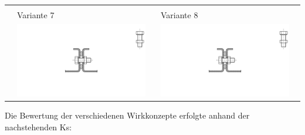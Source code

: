 \begin{longtable}{l p{6.55cm} p{6.55cm}}
\begin{minipage}{6.5cm}
        \end{minipage} \\
         & Variante 7 & Variante 8  \\ \nopagebreak
         & \noindent\begin{minipage}{6.5cm}
                \includegraphics[page=7, width=0.95\textwidth, trim = 13cm 7cm 12cm 7cm, clip]{Abbildungen/Kapitel3/Konzepte.pdf}
        \end{minipage} &
        \noindent\begin{minipage}{6.5cm}
                \includegraphics[page=8, width=0.95\textwidth, trim = 8.5cm 3cm 12cm 5.5cm, clip]{Abbildungen/Kapitel3/Konzepte.pdf}
        \end{minipage} \\
\end{longtable}


\par
\vspace{\linespace}
Die Bewertung der verschiedenen Wirkkonzepte erfolgte anhand der nachstehenden \acp{K}: 

